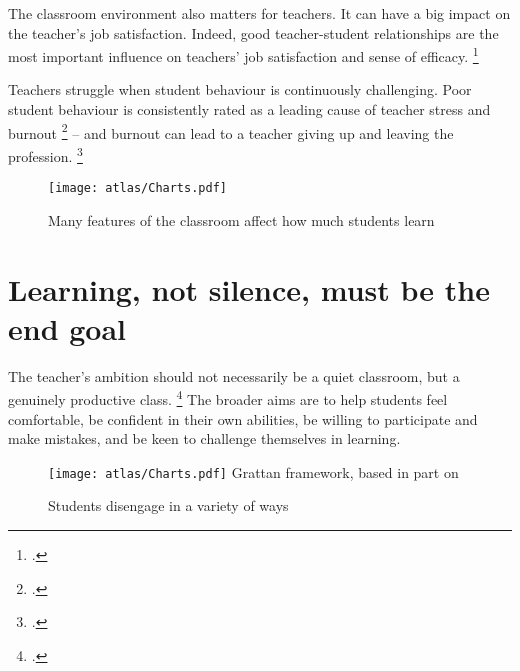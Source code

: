 \documentclass{grattan}
\begin{document}
The classroom environment also matters for teachers.
It can have a big impact on the teacher's job satisfaction. Indeed, good teacher-student relationships are the most important influence on teachers' job satisfaction and sense of efficacy.%
    \footcite[][144]{Freeman2014AustralianTeachersLearning}

Teachers struggle when student behaviour is continuously challenging. Poor student behaviour is consistently rated as a leading cause of teacher stress and burnout%
    \footcites{Lewis2005TeachersClassroomDiscipline}{Stoughton2007HowWillI}
 -- and burnout can lead to a teacher giving up and leaving the profession.%
    \footcite{Goddard2006BeginningTeacherBurnout}

\begin{figure}
\caption{Many features of the classroom affect how much students learn\label{fig:classroom-environment-factors}}%
\texttt{[image: atlas/Charts.pdf]}
%
{\textcite{Hattie2008visiblelearningsynthesis}}
\end{figure}


\section{Learning, not silence, must be the end goal}\label{sec:learning-not-silence}
The teacher's ambition should not necessarily be a quiet classroom, but a genuinely productive class. \footcite{Watkins2013DisposedToLearn} The broader aims are to help students feel comfortable, be confident in their own abilities, be willing to participate and make mistakes, and be keen to challenge themselves in learning.

\begin{figure}
\caption{Students disengage in a variety of ways\label{fig:students-disengage-variety-ways}}
\texttt{[image: atlas/Charts.pdf]}
%
{Grattan framework, based in part on \textcites{Angus2009PipelineProject}{Sullivan2014PunishThemEngage}}
\end{figure}
\end{document}
